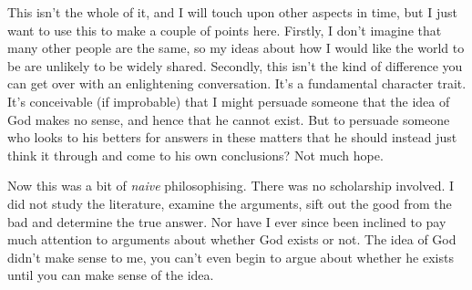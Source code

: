 This isn't the whole of it, and I will touch upon other aspects in time, but I just want to use this to make a couple of points here.
Firstly, I don't imagine that many other people are the same, so my ideas about how I would like the world to be are unlikely to be widely shared.
Secondly, this isn't the kind of difference you can get over with an enlightening conversation.
It's a fundamental character trait.
It's conceivable (if improbable) that I might persuade someone that the idea of God makes no sense, and hence that he cannot exist.
But to persuade someone who looks to his betters for answers in these matters that he should instead just think it through and come to his own conclusions?
Not much hope.

Now this was a bit of {\it naive} philosophising.
There was no scholarship involved.
I did not study the literature, examine the arguments, sift out the good from the bad and determine the true answer.
Nor have I ever since been inclined to pay much attention to arguments about whether God exists or not.
The idea of God didn't make sense to me, you can't even begin to argue about whether he exists until you can make sense of the idea.

